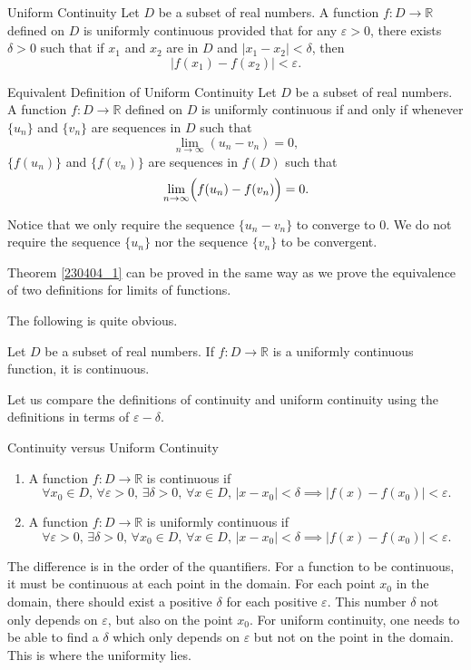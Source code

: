 \begin{example}
\begin{definition}{Uniform Continuity}
Let $D$ be a subset of real numbers. A function  $f:D\rightarrow\mathbb{R}$  defined on $D$ is uniformly continuous provided that for any $\varepsilon>0$, there exists $\delta>0$ such that if $x_1$ and $x_2$ are in $D$ and $|x_1-x_2|<\delta$, then 
\[|f(x_1)-f(x_2)|<\varepsilon.\]
 
\end{definition}

\begin{theorem}[label=230404_1]{Equivalent Definition of Uniform Continuity}
Let $D$ be a subset of real numbers. A function  $f:D\rightarrow\mathbb{R}$  defined on $D$ is uniformly continuous if and only if whenever $\{u_n\}$ and $\{v_n\}$ are sequences in $D$ such that
\[\lim_{n\rightarrow\infty}(u_n-v_n)=0,\]
$\{f(u_n)\}$ and $\{f(v_n)\}$ are sequences in $f(D)$ such that
\[\lim_{n\rightarrow\infty}\Bigl(f(u_n)-f(v_n)\Bigr)=0.\] 
\end{theorem}
Notice that   we only require the sequence $\{u_n-v_n\}$ to converge to 0. We do not require the sequence $\{u_n\}$ nor the sequence $\{v_n\}$ to be convergent.

Theorem \ref{230404_1} can be proved in the same way as we prove the equivalence of two  definitions for limits of functions.

The following is quite obvious.
 \begin{theorem}[label=t23021006]{}
Let $D$ be a subset of real numbers. If $f:D\rightarrow\mathbb{R}$ is a  uniformly continuous function, it is continuous.
\end{theorem}



  Let us compare the definitions of continuity and uniform continuity using the definitions in terms of $\varepsilon-\delta$.

\begin{highlight}{Continuity versus Uniform Continuity}
\begin{enumerate}[$\bullet$]\item
A function $f:D\rightarrow \mathbb{R}$ is continuous if
\[\forall x_0\in D,\,\forall \varepsilon>0, \,\exists \delta>0,\, \forall x \in D, \, |x-x_0|<\delta\implies |f(x)-f(x_0)|<\varepsilon.\]
\item A function $f:D\rightarrow \mathbb{R}$  is uniformly continuous if
\[\forall \varepsilon>0, \,\exists \delta>0,\, \forall x_0\in D,\,\forall x \in D, \, |x-x_0|<\delta\implies |f(x)-f(x_0)|<\varepsilon.\]\end{enumerate}
\end{highlight}
The difference is in the order of the quantifiers. For a function to be continuous, it must be continuous at each point in the domain. For each point  $x_0$ in the domain, there should exist a positive $\delta$ for each positive $\varepsilon$. This number $\delta$ not only depends on $\varepsilon$, but also on the point $x_0$. For uniform continuity, one needs to be able to find a $\delta$ which only depends on $\varepsilon$ but not on the point in the domain. This is where the uniformity lies.


\end{example}
